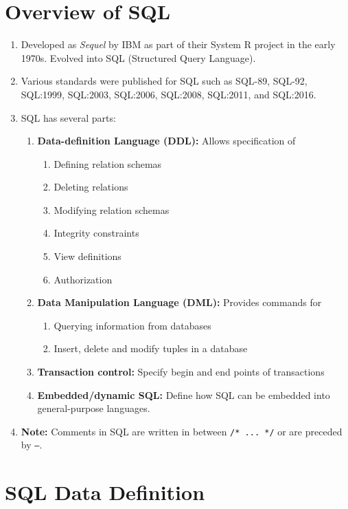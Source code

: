 \documentclass[journal,12pt,twocolumn]{IEEEtran}
\begin{document}
\section{Overview of SQL}
\begin{enumerate}
    \item Developed as \textit{Sequel} by IBM as part of their System R project
    in the early 1970s. Evolved into SQL (Structured Query Language).
    \item Various standards were published for SQL such as SQL-89, SQL-92,
    SQL:1999, SQL:2003, SQL:2006, SQL:2008, SQL:2011, and SQL:2016.
    \item SQL has several parts:
    \begin{enumerate}
        \item \textbf{Data-definition Language (DDL):} Allows specification of
        \begin{enumerate}
            \item Defining relation schemas
            \item Deleting relations
            \item Modifying relation schemas
            \item Integrity constraints
            \item View definitions
            \item Authorization
        \end{enumerate}
        \item \textbf{Data Manipulation Language (DML):} Provides commands for
        \begin{enumerate}
            \item Querying information from databases
            \item Insert, delete and modify tuples in a database
        \end{enumerate}
    \item \textbf{Transaction control:} Specify begin and end points of 
    transactions
    \item \textbf{Embedded/dynamic SQL:} Define how SQL can be embedded into
    general-purpose languages.
    \end{enumerate}
    \item \textbf{Note:} Comments in SQL are written in between 
        \texttt{/* ... */} or are preceded by \texttt{--}.
\end{enumerate}

\section{SQL Data Definition}
\end{document}
